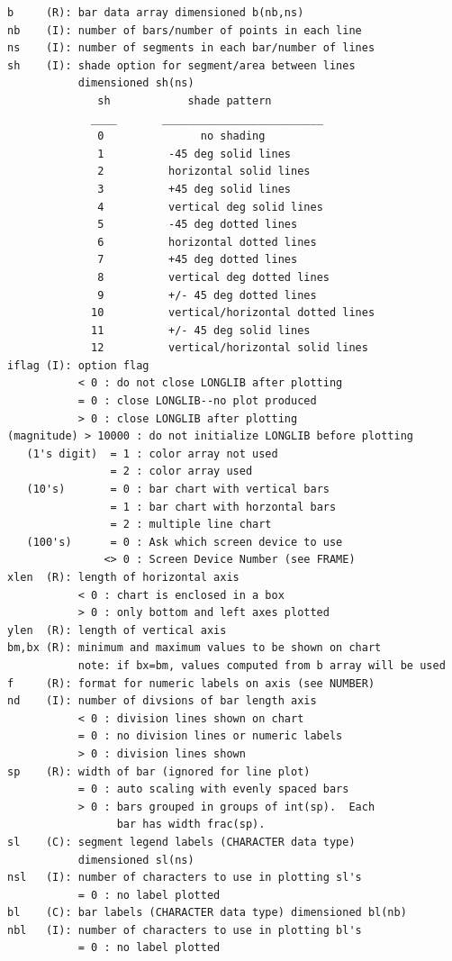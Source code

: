 \documentclass[11pt]{report}
\begin{document}
\begin{verbatim}
b     (R): bar data array dimensioned b(nb,ns)
nb    (I): number of bars/number of points in each line
ns    (I): number of segments in each bar/number of lines
sh    (I): shade option for segment/area between lines
           dimensioned sh(ns)
              sh            shade pattern
             ____       _________________________
              0               no shading
              1          -45 deg solid lines
              2          horizontal solid lines
              3          +45 deg solid lines
              4          vertical deg solid lines
              5          -45 deg dotted lines
              6          horizontal dotted lines
              7          +45 deg dotted lines
              8          vertical deg dotted lines
              9          +/- 45 deg dotted lines
             10          vertical/horizontal dotted lines
             11          +/- 45 deg solid lines
             12          vertical/horizontal solid lines
iflag (I): option flag
           < 0 : do not close LONGLIB after plotting
           = 0 : close LONGLIB--no plot produced
           > 0 : close LONGLIB after plotting
(magnitude) > 10000 : do not initialize LONGLIB before plotting
   (1's digit)  = 1 : color array not used
                = 2 : color array used
   (10's)       = 0 : bar chart with vertical bars
                = 1 : bar chart with horzontal bars
                = 2 : multiple line chart
   (100's)      = 0 : Ask which screen device to use
               <> 0 : Screen Device Number (see FRAME)
xlen  (R): length of horizontal axis
           < 0 : chart is enclosed in a box
           > 0 : only bottom and left axes plotted
ylen  (R): length of vertical axis
bm,bx (R): minimum and maximum values to be shown on chart
           note: if bx=bm, values computed from b array will be used
f     (R): format for numeric labels on axis (see NUMBER)
nd    (I): number of divsions of bar length axis
           < 0 : division lines shown on chart
           = 0 : no division lines or numeric labels
           > 0 : division lines shown
sp    (R): width of bar (ignored for line plot)
           = 0 : auto scaling with evenly spaced bars
           > 0 : bars grouped in groups of int(sp).  Each
                 bar has width frac(sp).
sl    (C): segment legend labels (CHARACTER data type)
           dimensioned sl(ns)
nsl   (I): number of characters to use in plotting sl's
           = 0 : no label plotted
bl    (C): bar labels (CHARACTER data type) dimensioned bl(nb)
nbl   (I): number of characters to use in plotting bl's
           = 0 : no label plotted

\end{verbatim}
\end{document}

